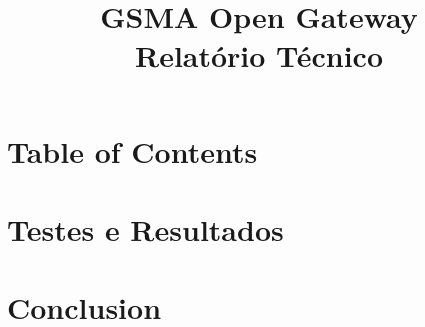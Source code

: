 \documentclass[code,math,bibliography]{relatorio-deti}
\title{GSMA Open Gateway\\[20pt]Relatório Técnico}
\begin{document}
\maketitle

%
%



\tableofcontents

\chapter*{Table of Contents}
\thispagestyle{empty}



\clearpage







\chapter{Testes e Resultados}

\chapter{Conclusion}

\printbibliography[heading=bibintoc]
\end{document}
